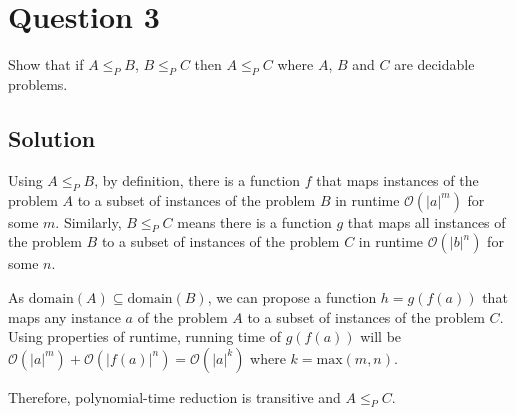 
\section*{Question 3}

Show that if $A \leq_P B$, $B \leq_P C$ then $A \leq_P C$ where $A$, $B$ and $C$ are decidable problems.

\subsection*{Solution}

Using $A \leq_P B$, by definition, there is a function $f$ that maps instances of the problem $A$ to a subset of instances of the problem $B$ in runtime $\mathcal{O}(|a|^m)$ for some $m$. Similarly, $B \leq_P C$ means there is a function $g$ that maps all instances of the problem $B$ to a subset of instances of the problem $C$ in runtime $\mathcal{O}(|b|^n)$ for some $n$.

As $\text{domain}(A) \subseteq \text{domain}(B)$, we can propose a function $h = g(f(a))$ that maps any instance $a$ of the problem $A$ to a subset of instances of the problem $C$. Using properties of runtime, running time of $g(f(a))$ will be $\mathcal{O}(|a|^m) + \mathcal{O}(|f(a)|^n) = \mathcal{O}(|a|^k)$ where $k = \text{max}(m,n)$.

Therefore, polynomial-time reduction is transitive and $A \leq_P C$.
